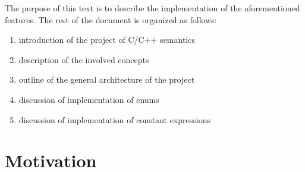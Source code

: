 \documentclass{fithesis3}
\begin{document}
The purpose of this text is to describe the implementation of the aforementioned features. The rest of the document is organized as follows:
\begin{enumerate}
\item introduction of the project of C/C++ semantics
\item description of the involved concepts
\item outline of the general architecture of the project
\item discussion of implementation of enums
\item discussion of implementation of constant expressions
\end{enumerate}







\section{Motivation}
\end{document}
